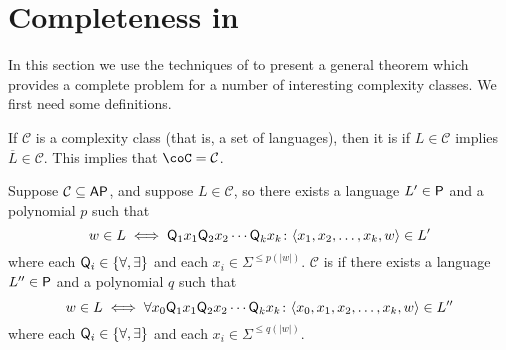 \section{Completeness in \texorpdfstring{\AP}{AP}}

In this section we use the techniques of \cite[Theorem~8.7]{bcffm} to present a general theorem which provides a complete problem for a number of interesting complexity classes.
We first need some definitions.

If $\mathcal{C}$ is a complexity class (that is, a set of languages), then it is  if $L\in\mathcal{C}$ implies $\overline{L}\in\mathcal{C}$.
This implies that $\coC=\mathcal{C}$.

Suppose $\mathcal{C}\subseteq\AP$, and suppose $L\in\mathcal{C}$, so there exists a language $L'\in\P$ and a polynomial $p$ such that
\begin{displaymath}
  w\in L \iff \Q_1x_1\Q_2x_2\cdots \Q_kx_k\colon \langle x_1, x_2, \ldots, x_k, w\rangle\in L'
\end{displaymath}
where each $\Q_i\in\{\forall, \exists\}$ and each $x_i\in\Sigma^{\leq p(|w|)}$.
$\mathcal{C}$ is  if there exists a language $L''\in\P$ and a polynomial $q$ such that
\begin{displaymath}
  w\in L \iff \forall x_0 \Q_1x_1\Q_2x_2\cdots \Q_kx_k\colon \langle x_0, x_1, x_2, \ldots, x_k, w \rangle\in L''
\end{displaymath}
where each $\Q_i\in\{\forall, \exists\}$ and each $x_i\in\Sigma^{\leq q(|w|)}$.

